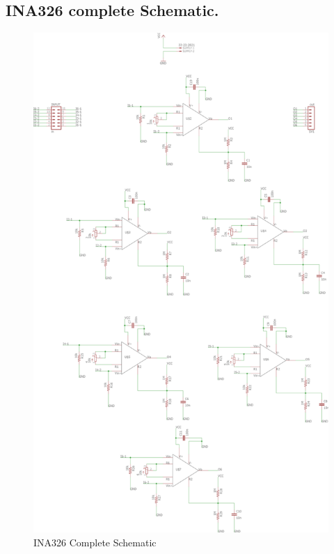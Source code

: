 \begin{annexesenv}

\partannexes

\chapter{INA326 complete Schematic.}

\begin{figure}[!htpb]
  \centering
  \caption{INA326 Complete Schematic}
  \label{INA-complete-schematic}
  \includegraphics[scale=0.35]{images/INA/complete-schematic}
\end{figure}


\end{annexesenv}
